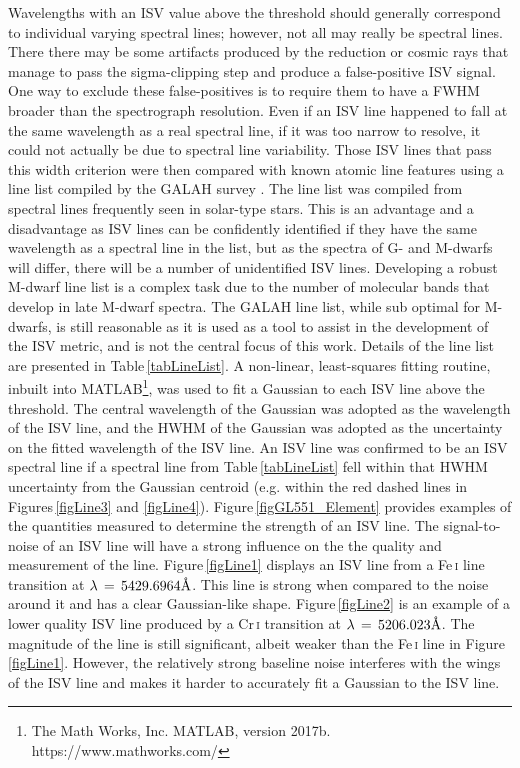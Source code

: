 Wavelengths with an ISV value above the threshold should generally correspond to individual varying spectral lines; however, not all may really be spectral lines. There there may be some artifacts produced by the reduction or cosmic rays that manage to pass the sigma-clipping step and produce a false-positive ISV signal. One way to exclude these false-positives is to require them to have a FWHM broader than the spectrograph resolution. Even if an ISV line happened to fall at the same wavelength as a real spectral line, if it was too narrow to resolve, it could not actually be due to spectral line variability. Those ISV lines that pass this width criterion were then compared with known atomic line features using a line list compiled by the GALAH survey \citep{2018Buder}. The line list was compiled from spectral lines frequently seen in solar-type stars. This is an advantage and a disadvantage as ISV lines can be confidently identified if they have the same wavelength as a spectral line in the list, but as the spectra of G- and M-dwarfs will differ, there will be a number of unidentified ISV lines. Developing a robust M-dwarf line list is a complex task due to the number of molecular bands that develop in late M-dwarf spectra. The GALAH line list, while sub optimal for M-dwarfs, is still reasonable as it is used as a tool to assist in the development of the ISV metric, and is not the central focus of this work. Details of the line list are presented in Table\,\ref{tabLineList}. A non-linear, least-squares fitting routine, inbuilt into MATLAB\footnote{The Math Works, Inc. MATLAB, version 2017b. https://www.mathworks.com/}, was used to fit a Gaussian to each ISV line above the threshold. The central wavelength of the Gaussian was adopted as the wavelength of the ISV line, and the HWHM of the Gaussian was adopted as the uncertainty on the fitted wavelength of the ISV line. An ISV line was confirmed to be an ISV spectral line if a spectral line from Table\,\ref{tabLineList} fell within that HWHM uncertainty from the Gaussian centroid (e.g. within the red dashed lines in Figures\,\ref{figLine3} and \ref{figLine4}). Figure\,\ref{figGL551_Element} provides examples of the quantities measured to determine the strength of an ISV line. The signal-to-noise of an ISV line will have a strong influence on the the quality and measurement of the line. Figure\,\ref{figLine1} displays an ISV line from a Fe\,\textsc{i} line transition at $\lambda\,=\,5429.6964\hbox{\AA}$. This line is strong when compared to the noise around it and has a clear Gaussian-like shape. Figure\,\ref{figLine2} is an example of a lower quality ISV line produced by a Cr\,\textsc{i} transition at $\lambda\,=\,5206.023\hbox{\AA}$. The magnitude of the line is still significant, albeit weaker than the Fe\,\textsc{i} line in Figure\,\ref{figLine1}. However, the relatively strong baseline noise interferes with the wings of the ISV line and makes it harder to accurately fit a Gaussian to the ISV line.\\

